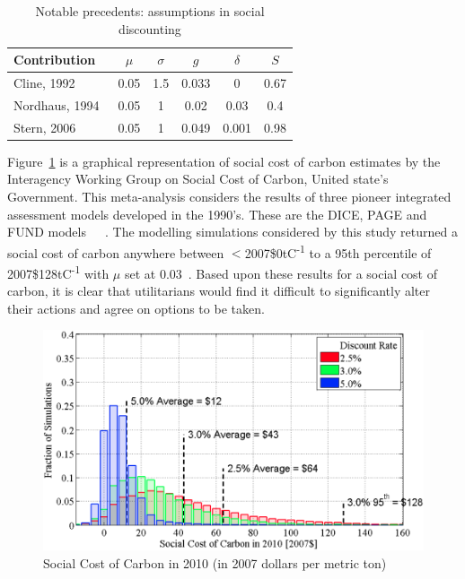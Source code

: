 \documentclass[11pt, oneside]{article}   	%
\begin{document}
\begin{table}[H]
\caption{Notable precedents: assumptions in social discounting}
\begin{center}
\begin{tabular}{| l | c | c | c | c | c |}
\hline
Contribution&$\mu$&$\sigma$&$g$&$\delta$&$S$\\
\hline
Cline, 1992~\cite{wc1}&0.05&1.5&0.033&0&0.67 \\
Nordhaus, 1994~\cite{wn1}&0.05&1&0.02&0.03&0.4 \\
Stern, 2006~\cite{ns1}&0.05&1&0.049&0.001&0.98 \\
\hline
\end{tabular}
\end{center}
\label{Social contributions table}
\end{table}

Figure~\ref{USA SCC figure} is a graphical representation of social cost of carbon estimates by the Interagency Working Group on Social Cost of Carbon, United state's Government.
This meta-analysis considers the results of three pioneer integrated assessment models developed in the 1990's.
These are the DICE, PAGE and FUND models~\cite{wn1}~\cite{ch1}~\cite{rsjt1}.
The modelling simulations considered by this study returned a social cost of carbon anywhere between $<$2007\$0tC\textsuperscript{-1} to a 95th percentile of 2007\$128tC\textsuperscript{-1} with $\mu$ set at 0.03~\cite{iwg1}. Based upon these results for a social cost of carbon, it is clear that utilitarians would find it difficult to significantly alter their actions and agree on options to be taken. 

\begin{figure}[H]
\centering
\includegraphics[width=1\textwidth]{scc}
\caption{Social Cost of Carbon in 2010 (in 2007 dollars per metric ton)}
\label{USA SCC figure}
\end{figure}
\end{document}
